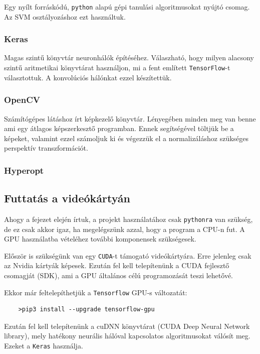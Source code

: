 Egy nyílt forráskódú, \texttt{python} alapú gépi tanulási algoritmusokat nyújtó csomag. 
Az SVM osztályozáshoz ezt használtuk.


\subsubsection{Keras\cite{keras}}

Magas szintű könyvtár neuronhálók építéséhez. Válaszható, hogy milyen alacsony szintű
aritmetikai könyvtárat használjon, mi a fent említett \texttt{TensorFlow}-t választottuk.
A konvolúciós hálónkat ezzel készítettük.

\subsubsection{OpenCV\cite{opencv}}

Számítógépes látáshoz írt képkezelő könyvtár. Lényegében minden meg van benne ami egy
átlagos képszerkesztő programban. Ennek segítségével töltjük be a képeket, valamint 
ezzel számoljuk ki és végezzük el a normalizáláshoz szükséges perspektív transzformációt.


\subsubsection{Hyperopt}

\subsection{Futtatás a videókártyán}
\label{sec:gpu.kovetelmenyek}

Ahogy a fejezet elején írtuk, a projekt használatához csak \texttt{pythonra} van szükség,
de ez csak akkor igaz, ha megelégszünk azzal, hogy a program a CPU-n fut. A GPU 
használatba vételéhez további komponensek szükségesek.


Először is szükségünk van egy \texttt{CUDA}-t\cite{cuda} támogató videókártyára. Erre jelenleg csak
az Nvidia kártyák képesek. Ezután fel kell telepítenünk a CUDA fejlesztő csomagját (SDK), ami a
GPU általános célú programozását teszi lehetővé. 


Ekkor már feltelepíthetjük a \texttt{Tensorflow} GPU-s változatát:
\begin{lstlisting}
	>pip3 install --upgrade tensorflow-gpu
\end{lstlisting}



Ezután fel kell telepítenünk a cuDNN könyvtárat (CUDA Deep Neural Network library), 
mely hatékony neurális hálóval kapcsolatos algoritmusokat válósít meg. Ezeket a 
\texttt{Keras} használja.


